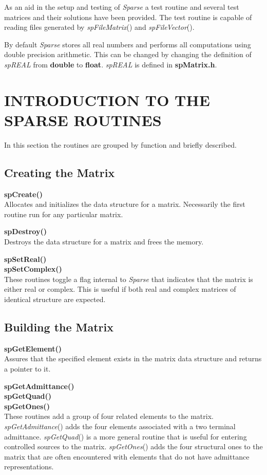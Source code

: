 \documentclass[11pt]{article}
\begin{document}
As an aid in the setup and testing of \emph{Sparse} a test routine and
several test matrices and their solutions have been provided.  The test
routine is capable of reading files generated by \emph{spFileMatrix}()
and \emph{spFileVector}().

By default \emph{Sparse} stores all real numbers and performs all
computations using double precision arithmetic.  This can be changed by
changing the definition of \emph{spREAL} from {\bf double} to
{\bf float}.  \emph{spREAL} is defined in {\bf spMatrix.h}.

\section{INTRODUCTION TO THE SPARSE ROUTINES}
In this section the routines are grouped by function and briefly described.

\subsection{Creating the Matrix}

{\bf spCreate()}\\
Allocates and initializes the data structure for a matrix.  Necessarily the
first routine run for any particular matrix.

{\bf spDestroy()}\\
Destroys the data structure for a matrix and frees the memory.

{\bf spSetReal()}\\
{\bf spSetComplex()}\\
These routines toggle a flag internal to \emph{Sparse} that indicates
that the matrix is either real or complex.  This is useful if both real
and complex matrices of identical structure are expected.

\subsection{Building the Matrix}
{\bf spGetElement()}\\
Assures that the specified element exists in the matrix data structure
and returns a pointer to it.

{\bf spGetAdmittance()}\\
{\bf spGetQuad()}\\
{\bf spGetOnes()}\\
These routines add a group of four related elements to the matrix.
\emph{spGetAdmittance}() adds the four elements associated with a two
terminal admittance.  \emph{spGetQuad}() is a more general routine that is
useful for entering controlled sources to the matrix.  \emph{spGetOnes}()
adds the four structural ones to the matrix that are often encountered
with elements that do not have admittance representations.
\end{document}
